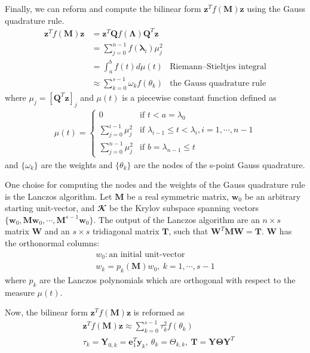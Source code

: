 \documentclass[senior,final,11pt]{iscs-thesis}
\begin{document}
Finally, we can reform and compute the bilinear form $\mathbf{z}^{T}f(\mathbf{M})\mathbf{z}$ using the Gauss quadrature rule.
\begin{align*}
    \mathbf{z}^{T}f(\mathbf{M})\mathbf{z} &= \mathbf{z}^{T}\mathbf{Q}f(\mathbf{\Lambda})\mathbf{Q}^T\mathbf{z}\\
    &= \sum_{j=0}^{n-1}f(\mathbf{\lambda}_i)\mu^2_j \\
    &= \int_a^b f(t) d\mu(t) &\text{Riemann–Stieltjes integral}\\
    &\approx \sum_{k=0}^{s-1} \omega_k f(\theta_k) &\text{the Gauss quadrature rule}
\end{align*}
where $\mu_j = [\mathbf{Q}^T\mathbf{z}]_j$ and $\mu(t)$ is a piecewise constant function defined as
\begin{align*}
    \mu(t) = \begin{cases}
        0 & \text{if $t<a=\lambda_0$} \\
        \sum_{j=0}^{i-1} \mu_j^2 & \text{if $\lambda_{i-1} \leq t < \lambda_i, i=1,\cdots, n-1$} \\
        \sum_{j=0}^{n-1} \mu_j^2 & \text{if $b=\lambda_{n-1}\leq t$}
      \end{cases}
\end{align*}
and $\{\omega_k\}$ are the weights and $\{\theta_k\}$ are the nodes of the s-point Gauss quadrature.

One choise for computing the nodes and the weights of the Gauss quadrature rule is the Lanczos algorithm. Let $\mathbf{M}$ be a real symmetric matrix, $\mathbf{w}_0$ be an arbitrary starting unit-vector, and ${\mathbfcal K}$ be the Krylov subspace spanning vectors $\{\mathbf{w}_0, \mathbf{M}\mathbf{w}_0, \cdots, \mathbf{M}^{s-1}\mathbf{w}_0\}$.
The output of the Lanczos algorithm are an $n \times s$ matrix $\mathbf{W}$ and an $s \times s$ tridiagonal matrix $\mathbf{T}$, such that $\mathbf{W}^T\mathbf{M}\mathbf{W} = \mathbf{T}$. $\mathbf{W}$ has the orthonormal columns:
\begin{align*}
    w_0 : \text{an initial unit-vector}\\
    w_k = p_k(\mathbf{M})w_0,~  k=1,\cdots,s-1
\end{align*}
where $p_k$ are the Lanczos polynomials which are orthogonal with respect to the measure $\mu(t)$.

Now, the bilinear form $\mathbf{z}^{T}f(\mathbf{M})\mathbf{z}$ is reformed as
\begin{align}
    &\mathbf{z}^{T}f(\mathbf{M})\mathbf{z} \approx  \sum_{k=0}^{s-1} \tau_k^2 f(\theta_k)\\
    &\tau_k = \mathbf{Y}_{0,k} = \mathbf{e}_1^T \mathbf{y}_k, ~ \theta_k= \Theta_{k,k}, ~ \mathbf{T}=\mathbf{Y}\mathbf{\Theta}\mathbf{Y}^T
\end{align}
\end{document}
